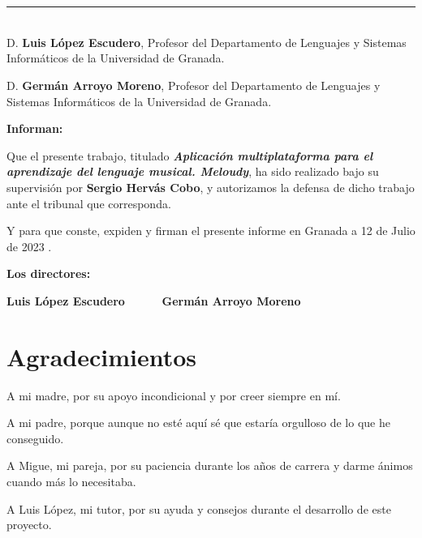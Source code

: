 \chapter*{}
\thispagestyle{empty}

\noindent\rule[-1ex]{\textwidth}{2pt}\\[4.5ex]

D. \textbf{Luis López Escudero}, Profesor del Departamento de Lenguajes y Sistemas Informáticos de la Universidad de Granada.

\vspace{0.5cm}

D. \textbf{Germán Arroyo Moreno}, Profesor del Departamento de Lenguajes y Sistemas Informáticos de la Universidad de Granada.


\vspace{0.5cm}

\textbf{Informan:}

\vspace{0.5cm}

Que el presente trabajo, titulado \textit{\textbf{Aplicación multiplataforma para el aprendizaje del lenguaje musical. Meloudy}},
ha sido realizado bajo su supervisión por \textbf{Sergio Hervás Cobo}, y autorizamos la defensa de dicho trabajo ante el tribunal
que corresponda.

\vspace{0.5cm}

Y para que conste, expiden y firman el presente informe en Granada a 12 de Julio de 2023 .

\vspace{1cm}

\textbf{Los directores:}

\vspace{5cm}

\noindent \textbf{Luis López Escudero \ \ \ \ \ Germán Arroyo Moreno}

\chapter*{Agradecimientos}
\thispagestyle{empty}

       \vspace{1cm}

A mi madre, por su apoyo incondicional y por creer siempre en mí. 

A mi padre, porque aunque no esté aquí sé que estaría orgulloso de lo que he conseguido. 

A Migue, mi pareja, por su paciencia durante los años de carrera y darme ánimos cuando más lo necesitaba. 

A Luis López, mi tutor, por su ayuda y consejos durante el desarrollo de este proyecto. 